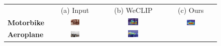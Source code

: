 \begin{figure}[H]
  \centering
  \setlength{\tabcolsep}{2pt} %
  \renewcommand{\arraystretch}{0.3}

  \begin{tcolorbox}[colframe=black!60, colback=white, boxrule=0.8pt, arc=2pt, left=2pt, right=2pt, top=2pt, bottom=2pt]
    \centering
    \begin{tabular}{m{2.5cm} c c c} %

    & (a) Input & (b) WeCLIP & (c) Ours
    \\
    [1mm]

    {\textbf{Motorbike}}
    & \includegraphics[width=0.18\textwidth,height=0.18\textwidth]{figures/originals/2007_002260}
    & \includegraphics[width=0.18\textwidth,height=0.18\textwidth]{figures/test_cams/weclip/2007_002260_13}
    & \includegraphics[width=0.18\textwidth,height=0.18\textwidth]{figures/test_cams/ours/2007_002260_13}
    \\
    \textbf{Aeroplane}
    & \includegraphics[width=0.18\textwidth,height=0.18\textwidth]{figures/originals/2007_000033}
    & \includegraphics[width=0.18\textwidth,height=0.18\textwidth]{figures/test_cams/weclip/2007_000033_0}

\end{tabular}
\end{tcolorbox}
\end{figure}
